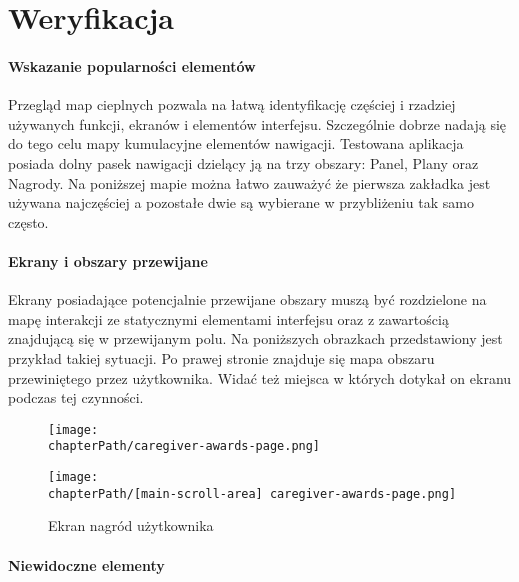 \section{Weryfikacja}

\paragraph{Wskazanie popularności elementów}
Przegląd map cieplnych pozwala na łatwą identyfikację częściej i rzadziej używanych funkcji, ekranów i elementów interfejsu. Szczególnie dobrze nadają się do tego celu mapy kumulacyjne elementów nawigacji. Testowana aplikacja posiada dolny pasek nawigacji dzielący ją na trzy obszary: Panel, Plany oraz Nagrody. Na poniższej mapie można łatwo zauważyć że pierwsza zakładka jest używana najczęściej a pozostałe dwie są wybierane w przybliżeniu tak samo często.

\bigskip
{}

\paragraph{Ekrany i obszary przewijane}
Ekrany posiadające potencjalnie przewijane obszary muszą być rozdzielone na mapę interakcji ze statycznymi elementami interfejsu oraz z zawartością znajdującą się w przewijanym polu. Na poniższych obrazkach przedstawiony jest przykład takiej sytuacji. Po prawej stronie znajduje się mapa obszaru przewiniętego przez użytkownika. Widać też miejsca w których dotykał on ekranu podczas tej czynności. 

\bigskip
\begin{figure}[H]
\centering
\begin{minipage}{.35\textwidth}
	\centering
	\texttt{[image: \\chapterPath/caregiver-awards-page.png]}
\end{minipage}
\begin{minipage}{.35\textwidth}
	\centering
	\texttt{[image: \\chapterPath/[main-scroll-area] caregiver-awards-page.png]}
\end{minipage}
\bigskip
\caption{Ekran nagród użytkownika}
\label{fig:rs_panel_parts}
\end{figure}

\paragraph{Niewidoczne elementy}


